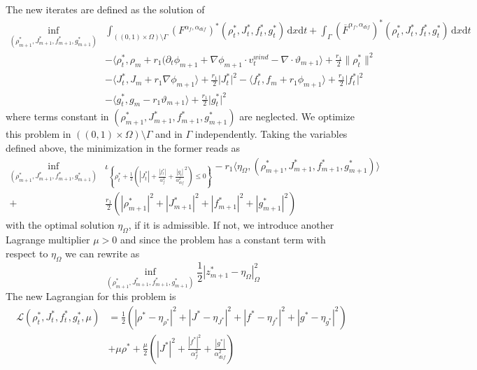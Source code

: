 The new iterates are defined as the solution of 
\begin{align*}
	\inf_{(\rho_{m+1}^*, J_{m+1}^*, f_{m+1}^*, g_{m+1}^*)} &\int_{((0,1)\times\Omega)\setminus\Gamma} (F^{\alpha_f,\alpha_{dif}})^*(\rho_t^*, J_t^*, f_t^*,g_t^*)\,\mathrm{d}x\mathrm{d}t + \int_\Gamma (\overline{F}^{\alpha_f,\alpha_{dif}})^*(\rho_t^*,J_t^*,f_t^*,g_t^*)\,\mathrm{d}x\mathrm{d}t\\
															&- \langle\rho_t^*,\rho_m + r_1(\partial_t\phi_{m+1} + \nabla\phi_{m+1} \cdot v_t^{wind} - \nabla \cdot \vartheta_{m+1} \rangle+ \frac{r_1}{2} \lVert \rho_t^*\rVert^2\\
	&-\langle J_t^*, J_m + r_1\nabla\phi_{m+1}\rangle+ \frac{r_1}{2} \lvert J_t^*\rvert^2-\langle f_t^*, f_m + r_1\phi_{m+1}\rangle+ \frac{r_1}{2} \lvert f_t^*\rvert^2\\
	&-\langle g_t^*, g_m - r_1\vartheta_{m+1}\rangle+ \frac{r_1}{2}\lvert g_t^*\rvert^2
\end{align*}
where terms constant in $(\rho_{m+1}^*,J_{m+1}^*, f_{m+1}^*, g_{m+1}^*)$ are neglected. We optimize this problem in $((0,1)\times \Omega)\setminus\Gamma$ and in $\Gamma$ independently.
Taking the variables defined above, the minimization in the former reads as
\begin{equation}\label{eq:Update2}
\begin{aligned}
	\inf_{(\rho_{m+1}^*, J_{m+1}^*, f_{m+1}^*, g_{m+1}^*)} &\iota_{\left\{ \rho_t^* + \frac{1}{2} \left(|J_t^*| + \frac{|f_t^*|}{\alpha_f^2} + \frac{|g_t|}{\alpha_{dif}^2}^2\right)\leq 0 \right\}} - r_1\langle \eta_\Omega , (\rho_{m+1}^*, J_{m+1}^*, f_{m+1}^*, g_{m+1}^*)\rangle \\
																	 +&\frac{r_1}{2} (|\rho_{m+1}^*|^2 + |J_{m+1}^*|^2 + |f_{m+1}^*|^2 + |g_{m+1}^*|^2)
\end{aligned}
\end{equation}
with the optimal solution $\eta_\Omega$, if it is admissible. If not, we introduce another Lagrange multiplier $\mu >0$ and since the problem has a constant term with respect to $\eta_\Omega$ we can rewrite as
$$
\inf_{(\rho_{m+1}^*, J_{m+1}^*, f_{m+1}^*, g_{m+1}^*)} \frac{1}{2}|z_{m+1}^* - \eta_\Omega|_\Omega^2
$$
The new Lagrangian for this problem is
\begin{align*}
	\mathcal{L}(\rho_t^*, J_t^*, f_t^*, g_t^*, \mu) &= \frac{1}{2}(|\rho^*-\eta_{\rho^*}|^2 + |J^* - \eta_{J^*}|^2 + |f^*-\eta_{f^*}|^2 + |g^* - \eta_{g^*}|^2) \\&+ \mu\rho^* + \frac{\mu}{2}\left(|J^*|^2 + \frac{|f^*|^2}{\alpha_f^2} + \frac{|g^*|}{\alpha_{dif}^2}\right)
\end{align*}
